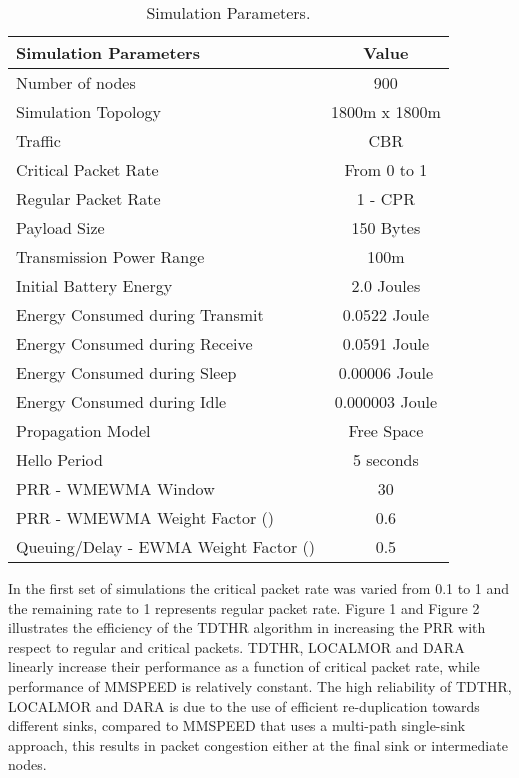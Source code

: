 \documentclass[fleqn,twoside]{article}
\begin{document}
\begin{table}[ht]
\centering
\caption{Simulation Parameters.}
\begin{tiny}
\begin{tabular}{|l|c| } \hline
{\bf Simulation Parameters} & {\bf  Value} \\ \hline
{Number of nodes} 		&{900} \\ \hline
{Simulation Topology} 		&{1800m x 1800m} \\ \hline
{Traffic} 			&{CBR} \\ \hline
{Critical Packet Rate} 		&{From 0 to 1} \\ \hline
{Regular Packet Rate} 		&{1 - CPR} \\ \hline
{Payload Size} 			&{150 Bytes} \\ \hline
{Transmission Power Range}			&{100m} \\ \hline
{Initial Battery Energy }		&{2.0 Joules} \\ \hline
{Energy Consumed during Transmit }	&{0.0522 Joule} \\ \hline
{Energy Consumed during Receive }	&{0.0591 Joule} \\ \hline
{Energy Consumed during Sleep }		&{0.00006 Joule} \\ \hline
{Energy Consumed during Idle }		&{0.000003 Joule} \\ \hline
{Propagation Model}		&{Free Space} \\ \hline
{Hello Period} 			&{5 seconds} \\ \hline
{PRR - WMEWMA Window} 			&{30} \\ \hline
{PRR - WMEWMA Weight Factor ()}	&{0.6} \\ \hline
{Queuing/Delay - EWMA Weight Factor ()}	&{0.5} \\ \hline
\end{tabular}
\end{tiny}
\end{table}

In the first set of simulations the critical packet rate was varied from 0.1 to 1 and the remaining rate to 1 represents 
regular packet rate. Figure 1 and Figure 2 illustrates the efficiency of the TDTHR algorithm in increasing the PRR with respect
to regular and critical packets.
TDTHR, LOCALMOR and DARA linearly increase their performance as a function
of critical packet rate, while performance of MMSPEED is relatively constant. 
The high reliability of TDTHR, LOCALMOR and DARA is due to the use of efficient re-duplication towards different sinks, compared to MMSPEED that uses a multi-path single-sink approach, this results in packet congestion either at the final
sink or intermediate nodes. 
\end{document}
